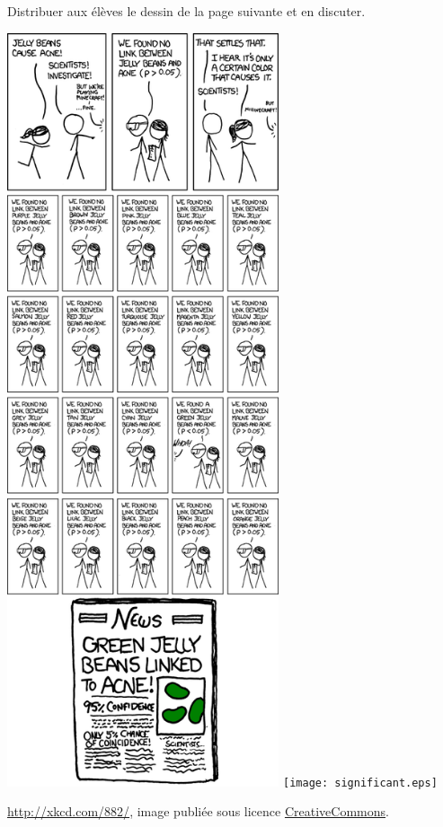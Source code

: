 

Distribuer aux élèves le dessin de la page suivante et en discuter.
\begin{center}

           \ifpdf
            \includegraphics[width=8cm]{significant.png}
        \else
            \texttt{[image: significant.eps]}

            \fi

            \url{http://xkcd.com/882/}, image publiée sous licence \href{http://xkcd.com/license.html}{CreativeCommons}.

\end{center}

